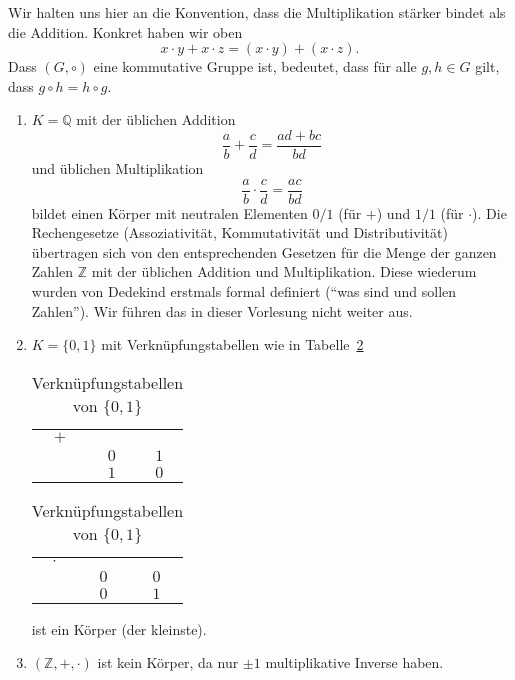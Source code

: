 \documentclass[../main.tex]{subfiles}
\begin{document}
Wir halten uns hier an die Konvention, dass die Multiplikation stärker
bindet als die Addition. Konkret haben wir oben
\[ x \cdot y + x \cdot z = (x \cdot y) + (x \cdot z).\]
Dass $(G, \circ)$ eine kommutative Gruppe ist, bedeutet,
dass für alle $g, h \in G$ gilt, dass $g \circ h = h \circ g$.

\begin{examples}
  \leavevmode
  \begin{enumerate}[(1)]
    \item $K = \mathbb Q$ mit der üblichen Addition
      \[ \frac{a}{b} + \frac{c}{d} = \frac{ad + bc}{bd}\]
      und üblichen Multiplikation
      \[ \frac{a}{b} \cdot \frac{c}{d} = \frac{ac}{bd}\]
      bildet einen Körper mit neutralen Elementen $0/1$ (für $+$) und $1/1$ (für $\cdot$).
      Die Rechengesetze (Assoziativität, Kommutativität und Distributivität) übertragen
      sich von den entsprechenden Gesetzen für die Menge der ganzen Zahlen $\mathbb Z$
      mit der üblichen Addition und Multiplikation.
      Diese wiederum wurden von Dedekind erstmals formal definiert (``was
      sind und sollen Zahlen'').
      Wir
      führen das in dieser Vorlesung nicht weiter aus.
    \item $K = \{0, 1\}$ mit Verknüpfungstabellen
      wie in Tabelle~\ref{tab:01}
      \begin{table}[h]
        \centering
        \begin{minipage}{0.25\linewidth}
          \centering
        \begin{tabular}[h]{ccc}
         $+$ & \color{gray}{$0$} & \color{gray}{$1$}\\
        \color{gray}{$0$} & $0$ & $1$ \\
        \color{gray}{$1$} & $1$ & $0$
        \end{tabular}%
        \end{minipage}%
        \begin{minipage}{0.25\linewidth}
          \centering
        \begin{tabular}[h]{ccc}
          $\cdot$ & \color{gray}{$0$} & \color{gray}{$1$} \\
          \color{gray}{$0$} & $0$ & $0$ \\
          \color{gray}{$1$} & $0$ & $1$
        \end{tabular}
      \end{minipage}
      \caption{Verknüpfungstabellen von $\{0, 1\}$}%
      \label{tab:01}
      \end{table}
      ist ein Körper (der kleinste).
    \item $(\mathbb Z, + , \cdot)$ ist kein Körper, da nur $\pm 1$ multiplikative
      Inverse haben.
  \end{enumerate}
\end{examples}
\end{document}
